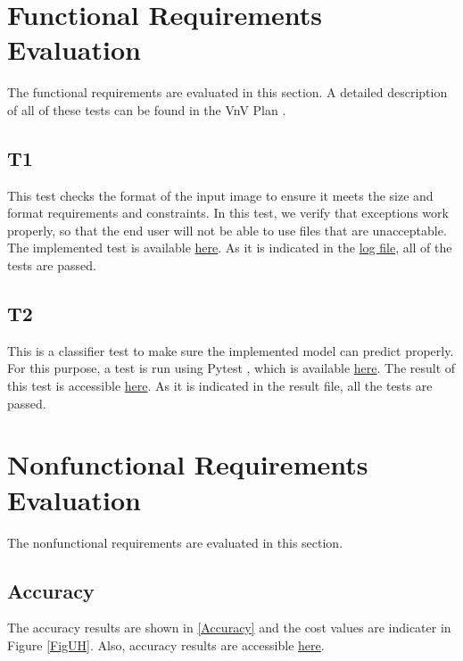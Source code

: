 \documentclass[12pt, titlepage]{article}
\begin{document}
\section{Functional Requirements Evaluation} \label{funcreq}
The functional requirements are evaluated in this section. 
A detailed description of all of these tests can be found in the VnV Plan 
\citep{VnVPlan}.

\subsection{T1}
This test checks the format of the input image to ensure it meets the size and 
format requirements and constraints. In this test, we verify that exceptions 
work properly, so that the end user will not be able to use files that are unacceptable.
The implemented test is available 
\href{https://github.com/tanya-jp/ANN-CAS741/blob/main/test/test_image_properties.py}{here}.
As it is indicated in the 
\href{https://github.com/tanya-jp/ANN-CAS741/blob/main/test/test_image_properties.log}{log file}, 
all of the tests are passed.

\subsection{T2}
This is a classifier test to make sure the implemented model can predict properly. 
For this purpose, a test is run using Pytest 
\citep{pytest}, 
which is available \href{https://github.com/tanya-jp/ANN-CAS741/blob/main/test/test_classifier.py}{here}. 
The result of this test is accessible 
\href{https://github.com/tanya-jp/ANN-CAS741/blob/main/test/test_classifier.log}{here}.
As it is indicated in the result file, all the tests are passed.

\section{Nonfunctional Requirements Evaluation} \label{nfuncreq}
The nonfunctional requirements are evaluated in this section.

\subsection{Accuracy}

The accuracy results are shown in \autoref{Accuracy} and the cost values
are indicater in Figure \ref{FigUH}. 
Also, accuracy results are accessible 
\href{https://github.com/tanya-jp/ANN-CAS741/blob/main/test/training_res.txt}{here}.
\end{document}
